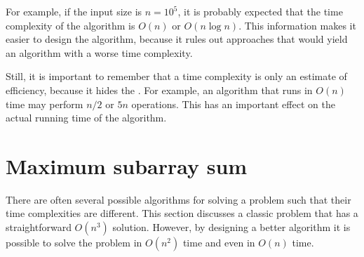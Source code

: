 For example, if the input size is $n=10^5$,
it is probably expected that the time
complexity of the algorithm is $O(n)$ or $O(n \log n)$.
This information makes it easier to design the algorithm,
because it rules out approaches that would yield
an algorithm with a worse time complexity.


Still, it is important to remember that a
time complexity is only an estimate of efficiency,
because it hides the .
For example, an algorithm that runs in $O(n)$ time
may perform $n/2$ or $5n$ operations.
This has an important effect on the actual
running time of the algorithm.

\section{Maximum subarray sum}


There are often several possible algorithms
for solving a problem such that their
time complexities are different.
This section discusses a classic problem that
has a straightforward $O(n^3)$ solution.
However, by designing a better algorithm it
is possible to solve the problem in $O(n^2)$
time and even in $O(n)$ time.

